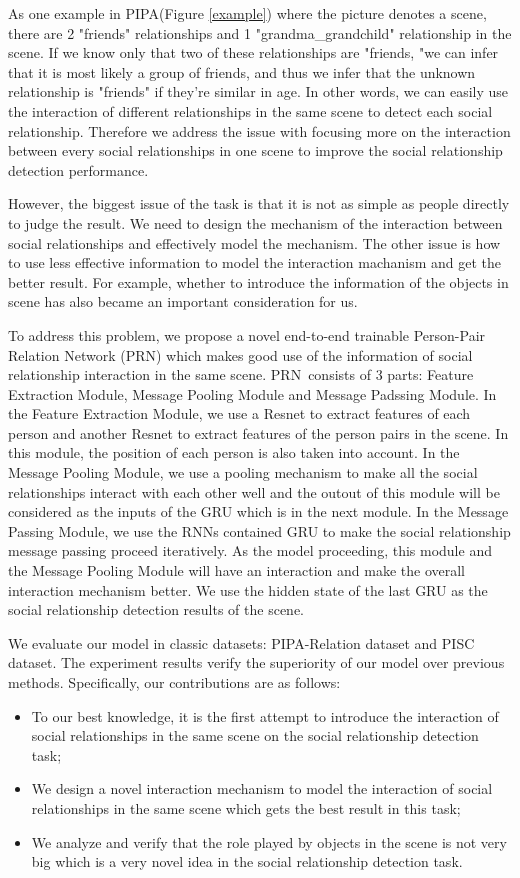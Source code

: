 \documentclass{article}
\newcommand{\PRN}{{\sf PRN}}
\begin{document}
As one example in PIPA(Figure \ref{example}) where the picture denotes a scene, there are 2  "friends" relationships and 1 "grandma\_grandchild" relationship in the scene. If we know only that two of these relationships are "friends, "we can infer that it is most likely a group of friends, and thus we infer that the unknown relationship is "friends" if they're similar in age. In other words, we can easily use the interaction of different relationships in the same scene to detect each social relationship. Therefore we address the issue with focusing more on the interaction between every social relationships in one scene to improve the social relationship detection performance.

However, the biggest issue of the task is that it is not as simple as people directly to judge the result. We need to design the mechanism of the interaction between social relationships and effectively model the mechanism. The other issue is how to use less effective information to model the interaction machanism and get the better result. For example, whether to introduce the information of the objects in scene has also became an important consideration for us.

To address this problem, we propose a novel end-to-end trainable Person-Pair Relation Network (\PRN) which makes good use of the information of social relationship interaction in the same scene. \PRN \ consists of 3 parts:  Feature Extraction Module, Message Pooling Module and Message Padssing Module. In the Feature Extraction Module, we use a Resnet to extract features of each person and another Resnet to extract features of the person pairs in the scene. In this module, the position of each person is also taken into account. In the Message Pooling Module, we use a pooling mechanism to make all the social relationships interact with each other well and the outout of this module will be considered as the inputs of the GRU which is in the next module. In the Message Passing Module,  we use the RNNs contained GRU to make the social relationship message passing proceed iteratively. As the model proceeding, this module and the Message Pooling Module will have an interaction and make the overall interaction mechanism better. We use the hidden state of the last GRU as the social relationship detection results of the scene.

We evaluate our model in classic datasets: PIPA-Relation dataset and PISC dataset. The experiment results verify the superiority of our model over previous methods. Specifically, our contributions are as follows:
\begin{itemize}
	\item To our best knowledge, it is the first attempt to introduce the interaction of social relationships in the same scene on the social relationship detection task;
	\item We design a novel interaction mechanism to model the interaction of social relationships in the same scene which gets the best result in this task;
	\item We analyze and verify that the role played by objects in the scene is not very big which is a very novel idea in the social relationship detection task.
\end{itemize}
\end{document}
